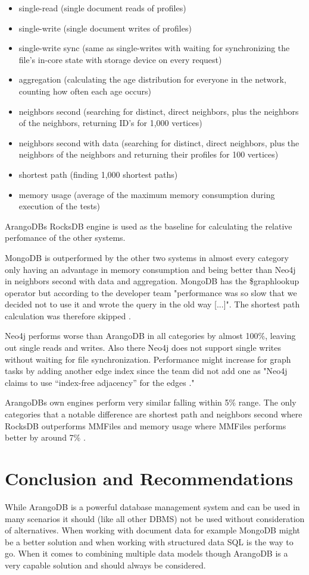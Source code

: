 \begin{itemize}
  \item single-read (single document reads of profiles)
  \item single-write (single document writes of profiles)
  \item single-write sync (same as single-writes with waiting for synchronizing the file's in-core state with storage device on every request)
  \item aggregation (calculating the age distribution for everyone in the network, counting how often each age occurs)
  \item neighbors second (searching for distinct, direct neighbors, plus the neighbors of the neighbors, returning ID’s for 1,000 vertices)
  \item neighbors second with data (searching for distinct, direct neighbors, plus the neighbors of the neighbors and returning their profiles for 100 vertices)
  \item shortest path (finding 1,000 shortest paths)
  \item memory usage (average of the maximum memory consumption during execution of the tests)
\end{itemize}

ArangoDBs RocksDB engine is used as the baseline for calculating the relative perfomance of the other systems.

MongoDB is outperformed by the other two systems in almost every category only having an advantage in memory consumption and being better than Neo4j in neighbors second with data and aggregation. MongoDB has the \$graphlookup operator but according to the developer team "performance was so slow that we decided not to use it and wrote the query in the old way [...]". The shortest path calculation was therefore skipped \parencite{DBBenchmark}.

Neo4j performs worse than ArangoDB in all categories by almost 100\%, leaving out single reads and writes. Also there Neo4j does not support single writes without waiting for file synchronization. Performance might increase for graph tasks by adding another edge index since the team did not add one as "Neo4j claims to use “index-free adjacency” for the edges \parencite{DBBenchmark}."

ArangoDBs own engines perform very similar falling within 5\% range. The only categories that a notable difference are shortest path and neighbors second where RocksDB outperforms MMFiles and memory usage where MMFiles performs better by around 7\% \parencite{DBBenchmark}.

\section{Conclusion and Recommendations}
While ArangoDB is a powerful database management system and can be used in many scenarios it should (like all other DBMS) not be used without consideration of alternatives. When working with document data for example MongoDB might be a better solution and when working with structured data SQL is the way to go. When it comes to combining multiple data models though ArangoDB is a very capable solution and should always be considered.
